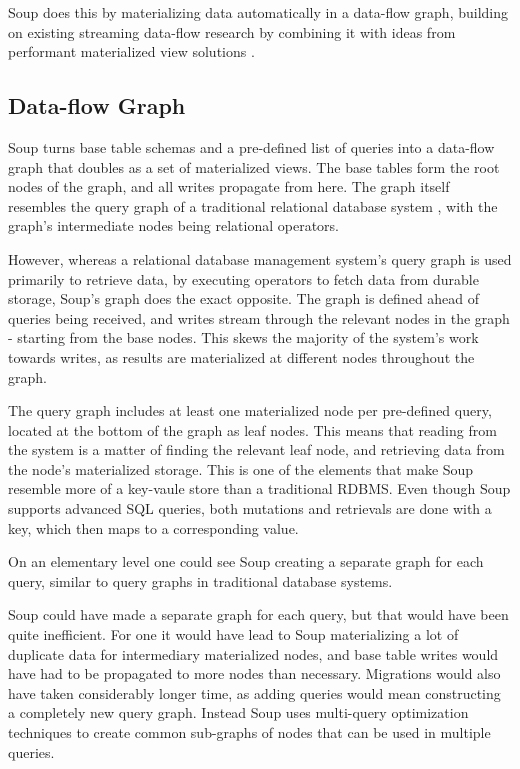 \documentclass[b5paper]{report}
\begin{document}
Soup does this by materializing data automatically in a data-flow
graph, building on existing streaming data-flow research \cite{naiad, dataflow}
by combining it with ideas from performant materialized view solutions
\cite{dbtoaster, pequod}.

\subsection{Data-flow Graph}
Soup turns base table schemas and a pre-defined list of queries into a data-flow
graph that doubles as a set of materialized views. The base tables form the
root nodes of the graph, and all writes propagate from here. The graph itself
resembles the query graph of a traditional relational database system
\cite{codd}, with the graph's intermediate nodes being relational operators.

However, whereas a relational database management system's query graph is used
primarily to retrieve data, by executing operators to fetch data from durable
storage, Soup's graph does the exact opposite. The graph is defined ahead of
queries being received, and writes stream through the relevant nodes in the
graph - starting from the base nodes. This skews the majority of the system's
work towards writes, as results are materialized at different nodes throughout
the graph.

The query graph includes at least one materialized node per pre-defined query,
located at the bottom of the graph as leaf nodes. This means that reading from
the system is a matter of finding the relevant leaf node, and retrieving data
from the node's materialized storage. This is one of the elements that make Soup
resemble more of a key-vaule store than a traditional RDBMS. Even though Soup
supports advanced SQL queries, both mutations and retrievals are done with a
key, which then maps to a corresponding value.

On an elementary level one could see Soup creating a separate graph for
each query, similar to query graphs in traditional database systems.

Soup could have made a separate graph for each query, but that would have been
quite inefficient. For one it would have lead to Soup materializing a lot of
duplicate data for intermediary materialized nodes, and base table writes would
have had to be propagated to more nodes than necessary. Migrations would also
have taken considerably longer time, as adding queries would mean constructing a
completely new query graph. Instead Soup uses multi-query optimization
techniques to create common sub-graphs of nodes that can be used in multiple
queries.
\end{document}
